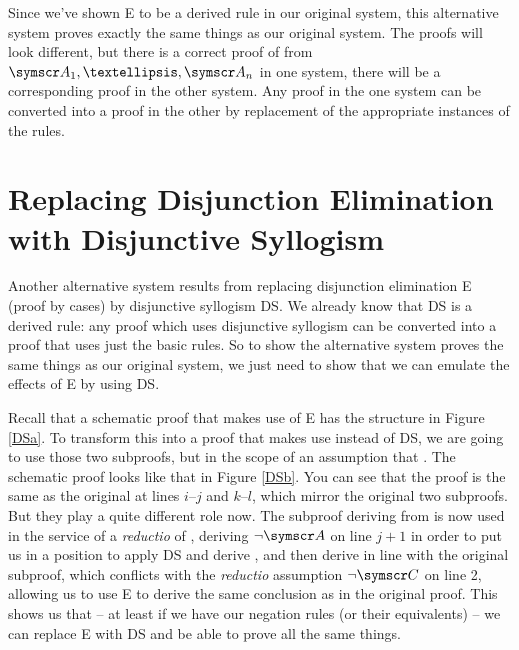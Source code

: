 Since we've shown {\enot\enot}E to be a derived rule in our original system, this alternative system proves exactly the same things as our original system. The proofs will look different, but there is a correct proof of  from $\meta{A}_{1},…,\meta{A}_{n}$ in one system, there will be a corresponding proof in the other system. Any proof in the one system can be converted into a proof in the other by replacement of the appropriate instances of the rules. 


\section{Replacing Disjunction Elimination with Disjunctive Syllogism} %
\label{sec:replacing_disjunction_elimination_with_disjunctive_syllogism}

Another alternative system results from replacing disjunction elimination {\eor}E (proof by cases) by disjunctive syllogism DS. We already know that DS is a derived rule: any proof which uses disjunctive syllogism can be converted into a proof that uses just the basic rules. So to show the alternative system proves the same things as our original system, we just need to show that we can emulate the effects of {\eor}E by using DS.

Recall that a schematic proof that makes use of {\eor}E has the structure in Figure \ref{DSa}. To transform this into a proof that makes use instead of DS, we are going to use those two subproofs, but in the scope of an assumption that \enot{}. The schematic proof looks like that in Figure \ref{DSb}. You can see that the proof is the same as the original at lines $i$–$j$ and $k$–$l$, which mirror the original two subproofs. But they play a quite different role now. The subproof deriving  from  is now used in the service of a \emph{reductio} of , deriving $\enot\meta{A}$ on line $j+1$ in order to put us in a position to apply DS and derive , and then derive  in line with the original subproof, which conflicts with the \emph{reductio} assumption $\enot\meta{C}$ on line 2, allowing us to use {\enot}E to derive the same conclusion as in the original proof. This shows us that – at least if we have our negation rules (or their equivalents) – we can replace {\eor}E with DS and be able to prove all the same things.

